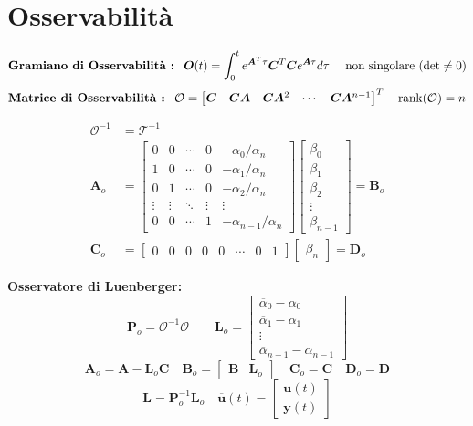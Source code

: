 \documentclass[a4paper]{article}
\renewcommand{\vec}{\bm}
\begin{document}
	\section*{Osservabilità}
	\[
		\text{\textbf{Gramiano di Osservabilità :} }\ \vec{O}(t) = \int_0^t e^{\vec{A}^T\tau}\vec{C}^T\vec{C}e^{\vec{A}\tau}d\tau\quad
		\text{ non singolare } (\det \neq 0)
	\]
	\[
	\text{\textbf{Matrice di Osservabilità :} }\
		\mathcal{O} =
		\begin{bmatrix}
			\vec{C} &\vec{C}\vec{A} & \vec{C}\vec{A}^2 & \cdots & \vec{C}\vec{A}^{n-1} 
		\end{bmatrix}^T \quad
		\rank (\mathcal{O}) = n
	\]
	\begin{multicols}{2}
		\begin{align*}
			\mathcal{O}^{-1} &= \mathcal{T}^{-1} \\
			\vec{A}_o &=
			\begin{bmatrix}
				0 & 0 & \cdots & 0 & -\alpha_0/\alpha_n \\
				1 & 0 & \cdots & 0 & -\alpha_1/\alpha_n \\
				0 & 1 & \cdots & 0 & -\alpha_2/\alpha_n \\
				\vdots & \vdots & \ddots & \vdots & \vdots \\
				0 & 0 & \cdots & 1 & -\alpha_{n-1}/\alpha_n
			\end{bmatrix}
			\begin{bmatrix}
				\beta_0 \\
				\beta_1 \\
				\beta_2 \\
				\vdots \\
				\beta_{n-1}
			\end{bmatrix}
			= \vec{B}_o \\
			\vec{C}_o &=
			\begin{bmatrix}
				0 & 0 & 0 & 0 & 0 & \cdots & 0 & 1  
			\end{bmatrix}
			\begin{bmatrix}
				\beta_n
			\end{bmatrix}
			= \vec{D}_o
		\end{align*}
		\columnbreak
		
		\textbf{Osservatore di Luenberger:}
		\[
			\vec{P}_o = \mathcal{O}^{-1} \mathcal{O} \qquad
			\vec{L}_o =
			\begin{bmatrix}
				\overline{\alpha}_0 - \alpha_0 \\ 
				\overline{\alpha}_1 - \alpha_1 \\
				\vdots \\
				\overline{\alpha}_{n-1} - \alpha_{n-1}
			\end{bmatrix}
		\]
		\[
			\vec{A}_o = \vec{A} - \vec{L}_o\vec{C} \quad
			\vec{B}_o =
			\begin{bmatrix}
				\vec{B} & \vec{L}_o
			\end{bmatrix}\quad
			\vec{C}_o = \vec{C}\quad \vec{D}_o = \vec{D}
		\]
		\[
			\vec{L} = \vec{P}_o^{-1}\vec{L}_o \quad
			\overline{\vec{u}} (t) = 
			\begin{bmatrix}
				\vec{u}(t) \\
				\vec{y}(t)
			\end{bmatrix}
		\]
		
	\end{multicols}
\end{document}
